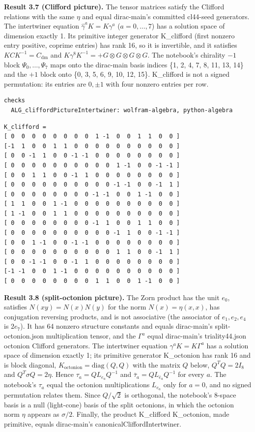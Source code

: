\documentclass[11pt]{article}
\begin{document}
\textbf{Result 3.7 (Clifford picture).} The tensor matrices satisfy the Clifford relations with the same $\eta$ and equal dirac-main's committed cl44-seed generators. The intertwiner equation $\hat\gamma^aK=K\gamma^a$ ($a=0,\dots,7$) has a solution space of dimension exactly 1. Its primitive integer generator K\_clifford (first nonzero entry positive, coprime entries) has rank 16, so it is invertible, and it satisfies $K C K^{-1}=C_{\mathrm{dm}}$ and $K\gamma^8K^{-1}=+G\otimes G\otimes G\otimes G$. The notebook's chirality $-1$ block $\Psi_0,\dots,\Psi_7$ maps onto the dirac-main basis indices \{1, 2, 4, 7, 8, 11, 13, 14\} and the $+1$ block onto \{0, 3, 5, 6, 9, 10, 12, 15\}. K\_clifford is not a signed permutation: its entries are $0,\pm1$ with four nonzero entries per row.

\begin{Verbatim}[fontsize=\small]
checks
  ALG_cliffordPictureIntertwiner: wolfram-algebra, python-algebra
\end{Verbatim}

\begin{Verbatim}[fontsize=\small]
K_clifford =
[ 0  0  0  0  0  0  0  0  1 -1  0  0  1  1  0  0 ]
[-1  1  0  0  1  1  0  0  0  0  0  0  0  0  0  0 ]
[ 0  0 -1  1  0  0 -1 -1  0  0  0  0  0  0  0  0 ]
[ 0  0  0  0  0  0  0  0  0  0  1 -1  0  0 -1 -1 ]
[ 0  0  1  1  0  0 -1  1  0  0  0  0  0  0  0  0 ]
[ 0  0  0  0  0  0  0  0  0  0 -1 -1  0  0 -1  1 ]
[ 0  0  0  0  0  0  0  0 -1 -1  0  0  1 -1  0  0 ]
[ 1  1  0  0  1 -1  0  0  0  0  0  0  0  0  0  0 ]
[ 1 -1  0  0  1  1  0  0  0  0  0  0  0  0  0  0 ]
[ 0  0  0  0  0  0  0  0 -1  1  0  0  1  1  0  0 ]
[ 0  0  0  0  0  0  0  0  0  0 -1  1  0  0 -1 -1 ]
[ 0  0  1 -1  0  0 -1 -1  0  0  0  0  0  0  0  0 ]
[ 0  0  0  0  0  0  0  0  0  0  1  1  0  0 -1  1 ]
[ 0  0 -1 -1  0  0 -1  1  0  0  0  0  0  0  0  0 ]
[-1 -1  0  0  1 -1  0  0  0  0  0  0  0  0  0  0 ]
[ 0  0  0  0  0  0  0  0  1  1  0  0  1 -1  0  0 ]
\end{Verbatim}

\textbf{Result 3.8 (split-octonion picture).} The Zorn product has the unit $e_0$, satisfies $N(xy)=N(x)N(y)$ for the norm $N(x)=\eta(x,x)$, has conjugation reversing products, and is not associative (the associator of $e_1,e_2,e_4$ is $2e_7$). It has 64 nonzero structure constants and equals dirac-main's split-octonion.json multiplication tensor, and the $\Gamma^a$ equal dirac-main's triality44.json octonion Clifford generators. The intertwiner equation $\gamma^aK=K\Gamma^a$ has a solution space of dimension exactly 1; its primitive generator K\_octonion has rank 16 and is block diagonal, $K_{\mathrm{octonion}}=\mathrm{diag}(Q,Q)$ with the matrix $Q$ below, $Q^TQ=2I_8$ and $Q^T\sigma Q=2\eta$. Hence $\tau_a=QL_{e_a}Q^{-1}$ and $\bar\tau_a=QL_{\bar e_a}Q^{-1}$ for every $a$. The notebook's $\tau_a$ equal the octonion multiplications $L_{e_a}$ only for $a=0$, and no signed permutation relates them. Since $Q/\sqrt2$ is orthogonal, the notebook's 8-space basis is a null (light-cone) basis of the split octonions, in which the octonion norm $\eta$ appears as $\sigma/2$. Finally, the product K\_clifford K\_octonion, made primitive, equals dirac-main's canonicalCliffordIntertwiner.
\end{document}
